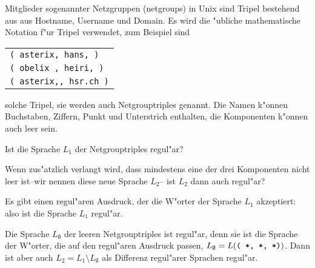 Mitglieder sogenannter Netzgruppen (netgroups) in Unix sind Tripel
bestehend aus aus Hostname, Username und Domain. Es wird die "ubliche
mathematische Notation f"ur Tripel verwendet, zum Beispiel sind
\begin{center}
\begin{tabular}{l}
{\tt ( asterix, hans, )}\\
{\tt ( obelix , heiri, )}\\
{\tt ( asterix,, hsr.ch )}
\end{tabular}
\end{center}
solche Tripel, sie werden auch Netgrouptriples genannt.
Die Namen k"onnen Buchstaben, Ziffern, Punkt und Unterstrich
enthalten, die Komponenten k"onnen auch leer sein.
\begin{teilaufgaben}
\item
Ist die Sprache $L_1$ der Netgrouptriples regul"ar?
\item
Wenn zus"atzlich verlangt wird, dass mindestens eine der drei
Komponenten nicht leer ist--wir nennen diese neue Sprache $L_2$-- ist $L_2$
dann auch regul"ar?
\end{teilaufgaben}

\begin{loesung}
\begin{teilaufgaben}
\item
Es gibt einen regul"aren Ausdruck, der die W"orter der Sprache $L_1$
akzeptiert:
also ist die Sprache $L_1$ regul"ar.
\item
Die Sprache $L_\emptyset$ der leeren Netgrouptriples ist regul"ar, denn sie ist die
Sprache der W"orter, die auf den regul"aren Ausdruck
passen, $L_\emptyset = L(\text{\tt ( *, *, *)})$. Dann ist
aber auch $L_2=L_1\setminus L_\emptyset$ als Differenz regul"arer
Sprachen regul"ar.
\end{teilaufgaben}
\end{loesung}

